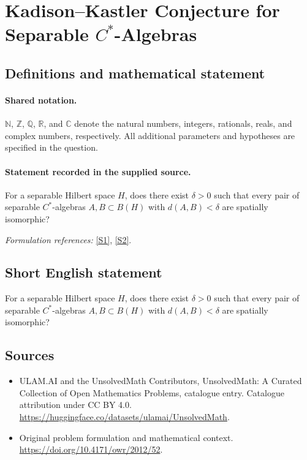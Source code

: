 \documentclass[11pt]{article}
\newcommand{\sref}[2]{\hyperlink{source:#1:#2}{[S#2]}}
\begin{document}
\section{\texorpdfstring{Kadison–Kastler Conjecture for Separable $C^*$-Algebras}{Kadison–Kastler Conjecture for Separable C\textasciicircum{}*-Algebras}}\label{statement}

\subsection{Definitions and mathematical statement}

\paragraph{Shared notation.}$\mathbb N$, $\mathbb Z$, $\mathbb Q$, $\mathbb R$, and $\mathbb C$ denote the natural numbers, integers, rationals, reals, and complex numbers, respectively. All additional parameters and hypotheses are specified in the question.


\paragraph{Statement recorded in the supplied source.}
For a separable Hilbert space $H$, does there exist $\delta>0$ such that every pair of separable $C^*$-algebras $A,B\subset B(H)$ with $d(A,B)<\delta$ are spatially isomorphic?
\par\smallskip\textit{Formulation references:} \sref{statement}{1}, \sref{statement}{2}.
\subsection{Short English statement}
For a separable Hilbert space $H$, does there exist $\delta>0$ such that every pair of separable $C^*$-algebras $A,B\subset B(H)$ with $d(A,B)<\delta$ are spatially isomorphic?
\subsection{Sources}
\begin{itemize}
\item[\hypertarget{source:statement:1}{S1}] ULAM.AI and the UnsolvedMath Contributors, UnsolvedMath: A Curated Collection of Open Mathematics Problems, catalogue entry. Catalogue attribution under CC BY 4.0.
\url{https://huggingface.co/datasets/ulamai/UnsolvedMath}.
\item[\hypertarget{source:statement:2}{S2}] Original problem formulation and mathematical context.
\url{https://doi.org/10.4171/owr/2012/52}.
\end{itemize}
\label{end:statement}
\end{document}
